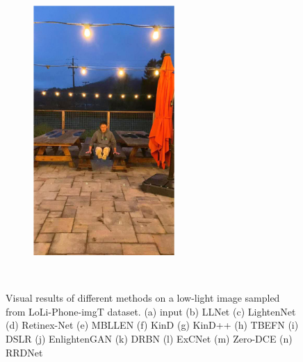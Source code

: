 \documentclass[letterpaper,12pt]{article}
\begin{document}
\begin{figure}[htbp]
\begin{subfigure}{0.128\textwidth}
			\includegraphics[width=\linewidth]{LoLi-Phone-imgT_1/RRDNet}
			\captionsetup{font=scriptsize}
			\caption{}
			\label{fig: LoLi-Phone-imgT_1_n}  
		\end{subfigure}\\
		
		\captionsetup{font=scriptsize}
		\caption{
			\label{fig: Visual Result from LoLi-Phone-imgT_1 dataset}
			Visual results of different methods on a low-light image sampled from LoLi-Phone-imgT dataset. (a) input (b) LLNet (c) LightenNet (d) Retinex-Net (e) MBLLEN  (f) KinD  (g) KinD++  (h) TBEFN  (i) DSLR  (j) EnlightenGAN  (k) DRBN  (l) ExCNet  (m) Zero-DCE  (n) RRDNet 
		}
	\end{figure}
	
\end{document}
